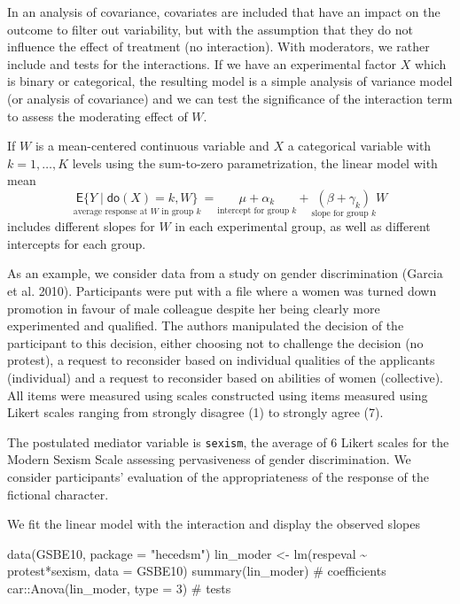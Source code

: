 \documentclass[
  11pt,
  letterpaper,
]{scrbook}
\newenvironment{Shaded}{\begin{snugshade}}{\end{snugshade}}
\newcommand{\AttributeTok}[1]{\textcolor[rgb]{0.40,0.45,0.13}{#1}}
\newcommand{\CommentTok}[1]{\textcolor[rgb]{0.37,0.37,0.37}{#1}}
\newcommand{\DecValTok}[1]{\textcolor[rgb]{0.68,0.00,0.00}{#1}}
\newcommand{\FunctionTok}[1]{\textcolor[rgb]{0.28,0.35,0.67}{#1}}
\newcommand{\NormalTok}[1]{\textcolor[rgb]{0.00,0.23,0.31}{#1}}
\newcommand{\OtherTok}[1]{\textcolor[rgb]{0.00,0.23,0.31}{#1}}
\newcommand{\SpecialCharTok}[1]{\textcolor[rgb]{0.37,0.37,0.37}{#1}}
\newcommand{\StringTok}[1]{\textcolor[rgb]{0.13,0.47,0.30}{#1}}
\theoremstyle{definition}
\theoremstyle{definition}
\theoremstyle{remark}
\begin{document}
In an analysis of covariance, covariates are included that have an
impact on the outcome to filter out variability, but with the assumption
that they do not influence the effect of treatment (no interaction).
With moderators, we rather include and tests for the interactions. If we
have an experimental factor \(X\) which is binary or categorical, the
resulting model is a simple analysis of variance model (or analysis of
covariance) and we can test the significance of the interaction term to
assess the moderating effect of \(W\).

If \(W\) is a mean-centered continuous variable and \(X\) a categorical
variable with \(k=1, \ldots, K\) levels using the sum-to-zero
parametrization, the linear model with mean \[
\underset{\text{average response at $W$ in group $k$}}{\mathsf{E}\{Y \mid \mathsf{do}(X) = k, W\}} = \underset{\text{intercept for group $k$}}{\mu + \alpha_k} + \underset{\text{slope for group $k$}}{(\beta + \gamma_k)}W
\] includes different slopes for \(W\) in each experimental group, as
well as different intercepts for each group.

As an example, we consider data from a study on gender discrimination
(Garcia et al. 2010). Participants were put with a file where a women
was turned down promotion in favour of male colleague despite her being
clearly more experimented and qualified. The authors manipulated the
decision of the participant to this decision, either choosing not to
challenge the decision (no protest), a request to reconsider based on
individual qualities of the applicants (individual) and a request to
reconsider based on abilities of women (collective). All items were
measured using scales constructed using items measured using Likert
scales ranging from strongly disagree (1) to strongly agree (7).

The postulated mediator variable is \texttt{sexism}, the average of 6
Likert scales for the Modern Sexism Scale assessing pervasiveness of
gender discrimination. We consider participants' evaluation of the
appropriateness of the response of the fictional character.

We fit the linear model with the interaction and display the observed
slopes

\begin{Shaded}
\begin{Highlighting}[]
\FunctionTok{data}\NormalTok{(GSBE10, }\AttributeTok{package =} \StringTok{"hecedsm"}\NormalTok{)}
\NormalTok{lin\_moder }\OtherTok{\textless{}{-}} \FunctionTok{lm}\NormalTok{(respeval }\SpecialCharTok{\textasciitilde{}}\NormalTok{ protest}\SpecialCharTok{*}\NormalTok{sexism,}
               \AttributeTok{data =}\NormalTok{ GSBE10)}
\FunctionTok{summary}\NormalTok{(lin\_moder) }\CommentTok{\# coefficients}
\NormalTok{car}\SpecialCharTok{::}\FunctionTok{Anova}\NormalTok{(lin\_moder, }\AttributeTok{type =} \DecValTok{3}\NormalTok{) }\CommentTok{\# tests}
\end{Highlighting}
\end{Shaded}
\end{document}
